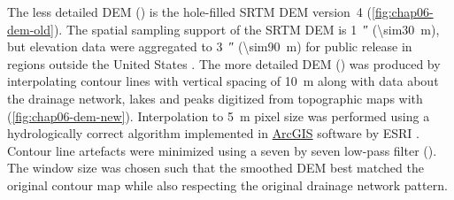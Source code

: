 \def\arcgis{\href{http://resources.arcgis.com/en/help/main/10.1/index.html}{ArcGIS}}

The less detailed DEM (\demOld) is the hole-filled SRTM DEM version~\num{4} \cite{JarvisEtAl2008} 
(\autoref{fig:chap06-dem-old}). The spatial sampling support of the SRTM DEM is \SI{1}{\arcsecond} 
(\SI{\sim30}{\m}), but elevation data were aggregated to \SI{3}{\arcsecond} (\SI{\sim90}{\m}) for public 
release in regions outside the United States \cite{ReuterEtAl2007}. The more detailed DEM (\demNew) was 
produced by interpolating contour lines with vertical spacing of \SI{10}{\m} along with data about the 
drainage network, lakes and peaks digitized from topographic maps with  
(\autoref{fig:chap06-dem-new}). Interpolation to \SI{5}{\m} pixel size was performed using a hydrologically 
correct algorithm implemented in \arcgis{} software by ESRI \cite{Hutchinson1989}. Contour line artefacts were 
minimized using a seven by seven low-pass filter (). The window size was chosen such that 
the smoothed DEM best matched the original contour map while also respecting the original drainage network 
pattern.








